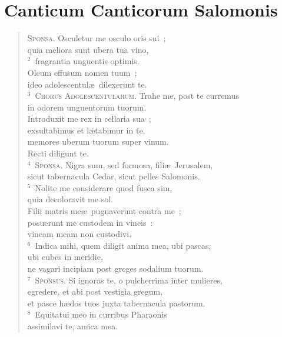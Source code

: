 \clearpage
{\centering \section*{Canticum Canticorum Salomonis}}\thispagestyle{empty}

\begin{flushleft}\begin{verse}\vspace{-11pt}\textsc{Sponsa.} Osculetur me osculo oris sui~;\\ quia meliora sunt ubera tua vino,\\
${}^{2}$~fragrantia unguentis optimis.\\ Oleum effusum nomen tuum~;\\ ideo adolescentul\ae\ dilexerunt te.\\
${}^{3}$~\textsc{Chorus Adolescentularum.} Trahe me, post te curremus\\ in odorem unguentorum tuorum.\\ Introduxit me rex in cellaria sua~;\\ exsultabimus et l\ae tabimur in te,\\ memores uberum tuorum super vinum.\\ Recti diligunt te.\\
${}^{4}$~\textsc{Sponsa.} Nigra sum, sed formosa, fili\ae\ Jerusalem,\\ sicut tabernacula Cedar, sicut pelles Salomonis.\\
${}^{5}$~Nolite me considerare quod fusca sim,\\ quia decoloravit me sol.\\ Filii matris me\ae\ pugnaverunt contra me~;\\ posuerunt me custodem in vineis~:\\ vineam meam non custodivi.\\
${}^{6}$~Indica mihi, quem diligit anima mea, ubi pascas,\\ ubi cubes in meridie,\\ ne vagari incipiam post greges sodalium tuorum.\\
${}^{7}$~\textsc{Sponsus.} Si ignoras te, o pulcherrima inter mulieres,\\ egredere, et abi post vestigia gregum,\\ et pasce h\ae dos tuos juxta tabernacula pastorum.\\
${}^{8}$~Equitatui meo in curribus Pharaonis\\ assimilavi te, amica mea.\\

\end{verse}
\end{flushleft}

